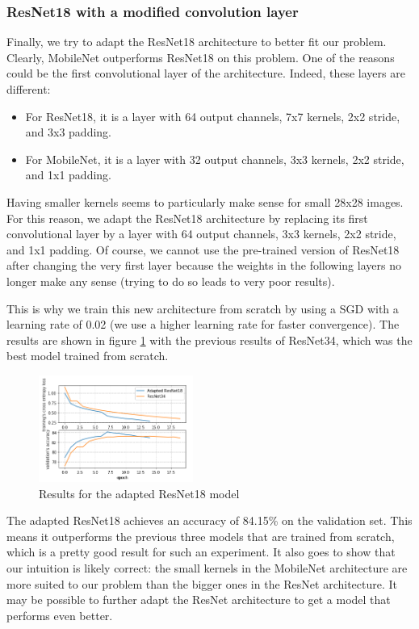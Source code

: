 \documentclass[10pt,twocolumn,letterpaper]{article}
\begin{document}
\subsubsection{ResNet18 with a modified convolution layer}

Finally, we try to adapt the ResNet18 architecture to better fit our problem. Clearly, MobileNet outperforms ResNet18 on this problem. One of the reasons could be the first convolutional layer of the architecture. Indeed, these layers are different:

\begin{itemize}
    \item For ResNet18, it is a layer with 64 output channels, 7x7 kernels, 2x2 stride, and 3x3 padding.
    \item For MobileNet, it is a layer with 32 output channels, 3x3 kernels, 2x2 stride, and 1x1 padding.
\end{itemize}

Having smaller kernels seems to particularly make sense for small 28x28 images. For this reason, we adapt the ResNet18 architecture by replacing its first convolutional layer by a layer with 64 output channels, 3x3 kernels, 2x2 stride, and 1x1 padding. Of course, we cannot use the pre-trained version of ResNet18 after changing the very first layer because the weights in the following layers no longer make any sense (trying to do so leads to very poor results).

This is why we train this new architecture from scratch by using a SGD with a learning rate of 0.02 (we use a higher learning rate for faster convergence). The results are shown in figure \ref{fig:cnn_adapted} with the previous results of ResNet34, which was the best model trained from scratch.

\begin{figure}[h] 
\centering
\includegraphics[width=0.45\textwidth]{images/cnn_adapted_results.png}
\caption{Results for the adapted ResNet18 model}
\label{fig:cnn_adapted}
\end{figure}

The adapted ResNet18 achieves an accuracy of 84.15\% on the validation set. This means it outperforms the previous three models that are trained from scratch, which is a pretty good result for such an experiment. It also goes to show that our intuition is likely correct: the small kernels in the MobileNet architecture are more suited to our problem than the bigger ones in the ResNet architecture. It may be possible to further adapt the ResNet architecture to get a model that performs even better.
\end{document}
